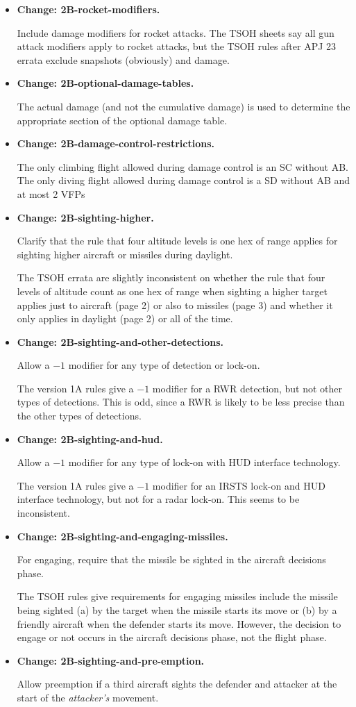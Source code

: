 \documentclass[10pt]{report}
\newcommand{\itemtag}[1]{\item \textbf{Change: #1.}\par}
\begin{document}
\begin{itemize}
    \itemtag{2B-rocket-modifiers} Include damage modifiers for rocket attacks. The TSOH sheets say all gun attack modifiers apply to rocket attacks, but the TSOH rules after APJ 23 errata exclude snapshots (obviously) and damage.
    
    \itemtag{2B-optional-damage-tables} The actual damage (and not the cumulative damage) is used to determine the appropriate section of the optional damage table.
    
    \itemtag{2B-damage-control-restrictions} The only climbing flight allowed during damage control is an SC without AB. The only diving flight allowed during damage control is a SD without AB and at most 2 VFPs

    \itemtag{2B-sighting-higher} Clarify that the rule that four altitude levels is one hex of range applies for sighting higher aircraft or missiles during daylight.  
    
    The TSOH errata are slightly inconsistent on whether the rule that four levels of altitude count as one hex of range when sighting a higher target applies just to aircraft (page 2) or also to missiles (page 3) and whether it only applies in daylight (page 2) or all of the time.
    
    \itemtag{2B-sighting-and-other-detections} Allow a $-1$ modifier for any type of detection or lock-on. 
    
    The version 1A rules give a $-1$ modifier for a RWR detection, but not other types of detections. This is odd, since a RWR is likely to be less precise than the other types of detections.
    
    \itemtag{2B-sighting-and-hud} Allow a $-1$ modifier for any type of lock-on with HUD interface technology. 
    
    The version 1A rules give a $-1$ modifier for an IRSTS lock-on and HUD interface technology, but not for a radar lock-on. This seems to be inconsistent.

    \itemtag{2B-sighting-and-engaging-missiles} For engaging, require that the missile be sighted in the aircraft decisions phase.
    
    The TSOH rules give requirements for engaging missiles include the missile being sighted (a) by the target when the missile starts its move or (b) by a friendly aircraft when the defender starts its move. However, the decision to engage or not occurs in the aircraft decisions phase, not the flight phase. 

    \itemtag{2B-sighting-and-pre-emption} Allow preemption if a third aircraft sights the defender and attacker at the start of the \emph{attacker's} movement.
    

\end{itemize}
\end{document}
